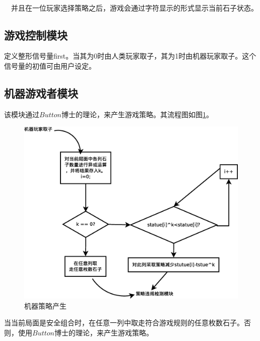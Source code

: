 \documentclass[UTF8,nofonts,cs4size]{ctexrep}
\begin{document}
\paragraph{}
\ \
并且在一位玩家选择策略之后，游戏会通过字符显示的形式显示当前石子状态。
\subsection{游戏控制模块}
定义整形信号量first。当其为0时由人类玩家取子，其为1时由机器玩家取子。这个信号量的初值可由用户设定。
\subsection{机器游戏者模块}
该模块通过$Button$博士的理论，来产生游戏策略。其流程图如图\ref{celue}。
\begin{figure}[htp]
\centering
\includegraphics[scale=0.4]{celue.eps}
\caption{机器策略产生}
\label{celue}
\end{figure}
当当前局面是安全组合时，在任意一列中取走符合游戏规则的任意枚数石子。否则，使用$Button$博士的理论，来产生游戏策略。
\end{document}
